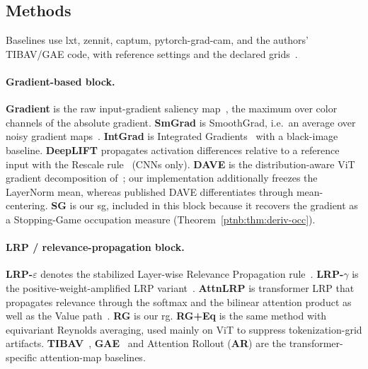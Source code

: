 \subsection{Methods}\label{ptnb:app:baselines}\label{app:baselines}

Baselines use lxt, zennit, captum, pytorch-grad-cam, and the authors' TIBAV/GAE code, with reference settings and the declared grids~\parencite{Achtibat2024AttnLRP,Anders2021Zennit,kokhlikyan2020captum,Gildenblat2021gradcam,Chefer2021GenericAttention,Chefer2021ICCV}.

\paragraph{Gradient-based block.}
\textbf{Gradient} is the raw input-gradient saliency map~\parencite{Simonyan2014}, the maximum over color channels of the absolute gradient. \textbf{SmGrad} is SmoothGrad, i.e.\ an average over noisy gradient maps~\parencite{Smilkov2017}. \textbf{IntGrad} is Integrated Gradients~\parencite{Sundararajan2017} with a black-image baseline. \textbf{DeepLIFT} propagates activation differences relative to a reference input with the Rescale rule~\parencite{Shrikumar2017} (CNNs only). \textbf{DAVE} is the distribution-aware ViT gradient decomposition of~\textcite{Wrobel2024}; our implementation additionally freezes the LayerNorm mean, whereas published DAVE differentiates through mean-centering. \textbf{SG} is our \ac{sg}, included in this block because it recovers the gradient as a Stopping-Game occupation measure (Theorem~\ref{ptnb:thm:deriv-occ}).

\paragraph{LRP / relevance-propagation block.}
\textbf{LRP-$\varepsilon$} denotes the stabilized Layer-wise Relevance Propagation rule~\parencite{Bach2015}. \textbf{LRP-$\gamma$} is the positive-weight-amplified LRP variant~\parencite{Montavon_2022_gammaLRP}. \textbf{AttnLRP} is transformer LRP that propagates relevance through the softmax and the bilinear attention product as well as the Value path~\parencite{Achtibat2024AttnLRP}. \textbf{RG} is our \ac{rg}. \textbf{RG+Eq} is the same method with equivariant Reynolds averaging, used mainly on ViT to suppress tokenization-grid artifacts. \textbf{TIBAV}~\parencite{Chefer2021GenericAttention}, \textbf{GAE}~\parencite{Chefer2021ICCV} and Attention Rollout (\textbf{AR}) are the transformer-specific attention-map baselines.

